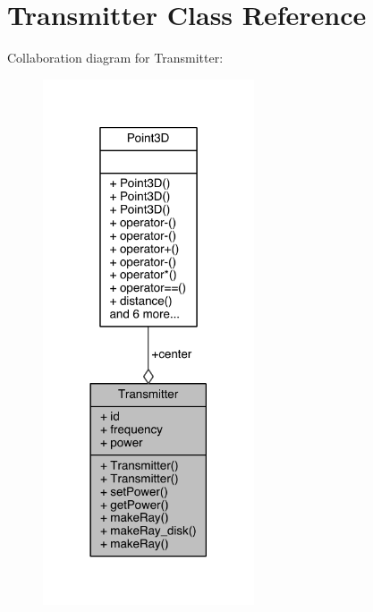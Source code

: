 \hypertarget{class_transmitter}{}\section{Transmitter Class Reference}
\label{class_transmitter}


Collaboration diagram for Transmitter\+:
\nopagebreak
\begin{figure}[H]
\begin{center}
\leavevmode
\includegraphics[width=177pt]{doxygen/latex/class_transmitter__coll__graph}
\end{center}
\end{figure}
